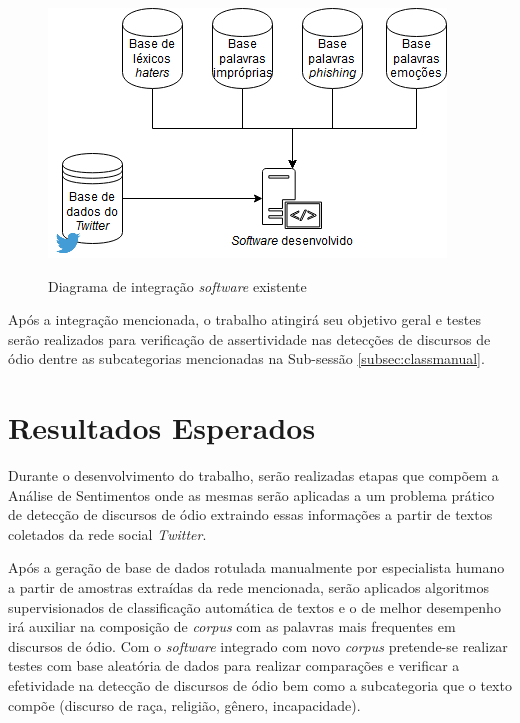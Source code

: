 \begin{figure}[!h]
\centering 
\caption{Diagrama de integração \textit{software} existente}
\includegraphics[scale=0.6]{imagens/implementacao.png}
\label{fig:implementacao}
\end{figure}
Após a integração mencionada, o trabalho atingirá seu objetivo geral e testes serão realizados para verificação de assertividade nas detecções de discursos de ódio dentre as subcategorias mencionadas na Sub-sessão \ref{subsec:classmanual}.

\section{Resultados Esperados}
Durante o desenvolvimento do trabalho, serão realizadas etapas que compõem a Análise de Sentimentos onde as mesmas serão aplicadas a um problema prático de detecção de discursos de ódio extraindo essas informações a partir de textos coletados da rede social \textit{Twitter}.

Após a geração de base de dados rotulada manualmente por especialista humano a partir de amostras extraídas da rede mencionada, serão aplicados algoritmos supervisionados de classificação automática de textos e o de melhor desempenho irá auxiliar na composição de \textit{corpus} com as palavras mais frequentes em discursos de ódio. Com o \textit{software} integrado com novo \textit{corpus} pretende-se realizar testes com base aleatória de dados para realizar comparações e verificar a efetividade na detecção de discursos de ódio bem como a subcategoria que o texto compõe (discurso de raça, religião, gênero, incapacidade).